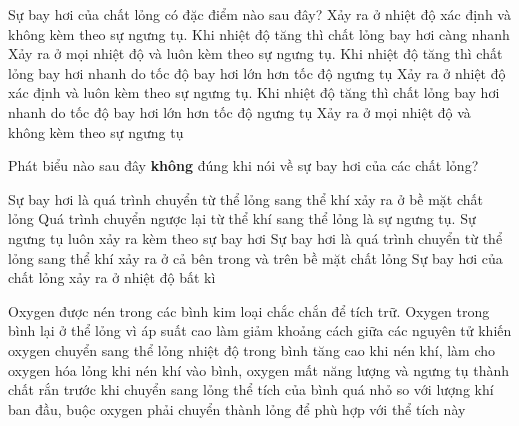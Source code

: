\begin{ex}%
	Sự bay hơi của chất lỏng có đặc điểm nào sau đây?
	\choice
	{Xảy ra ở nhiệt độ xác định và không kèm theo sự ngưng tụ. Khi nhiệt độ tăng thì chất lỏng bay hơi càng nhanh}
	{\True Xảy ra ở mọi nhiệt độ và luôn kèm theo sự ngưng tụ. Khi nhiệt độ tăng thì chất lỏng bay hơi nhanh do tốc độ bay hơi lớn hơn tốc độ ngưng tụ}
	{Xảy ra ở nhiệt độ xác định và luôn kèm theo sự ngưng tụ. Khi nhiệt độ tăng thì chất lỏng bay hơi nhanh do tốc độ bay hơi lớn hơn tốc độ ngưng tụ}
	{Xảy ra ở mọi nhiệt độ và không kèm theo sự ngưng tụ}
	\end{ex}

\begin{ex}
	Phát biểu nào sau đây \textbf{không} đúng khi nói về sự bay hơi của các chất lỏng?
	
	\choice
	{Sự bay hơi là quá trình chuyển từ thể lỏng sang thể khí xảy ra ở bề mặt chất lỏng}
	{Quá trình chuyển ngược lại từ thể khí sang thể lỏng là sự ngưng tụ. Sự ngưng tụ luôn xảy ra kèm theo sự bay hơi}
	{\True Sự bay hơi là quá trình chuyển từ thể lỏng sang thể khí xảy ra ở cả bên trong và trên bề mặt chất lỏng}
	{Sự bay hơi của chất lỏng xảy ra ở nhiệt độ bất kì}
	\end{ex}

\begin{ex}
	Oxygen được nén trong các bình kim loại chắc chắn để tích trữ. Oxygen trong bình lại ở thể lỏng vì
	\choice
	{\True áp suất cao làm giảm khoảng cách giữa các nguyên tử khiến oxygen chuyển sang thể lỏng}
	{nhiệt độ trong bình tăng cao khi nén khí, làm cho oxygen hóa lỏng}
	{khi nén khí vào bình, oxygen mất năng lượng và ngưng tụ thành chất rắn trước khi chuyển sang lỏng}
	{thể tích của bình quá nhỏ so với lượng khí ban đầu, buộc oxygen phải chuyển thành lỏng để phù hợp với thể tích này}
	\end{ex}

